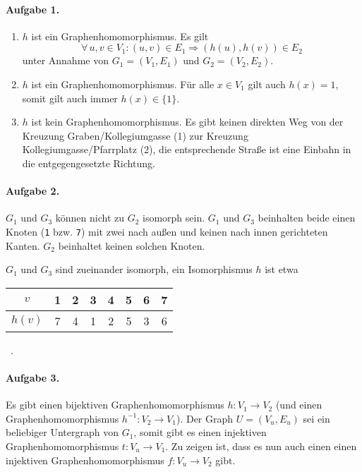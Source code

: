 \documentclass{article}
\begin{document}
\paragraph{Aufgabe 1.}

\begin{enumerate}[label=\alph*)]
    \item $h$ ist ein Graphenhomomorphismus. Es gilt
    \begin{equation*}
        \forall\, u, v \in V_1 : (u, v) \in E_1 \Rightarrow (h(u), h(v)) \in E_2
    \end{equation*}
    unter Annahme von $G_1 = (V_1, E_1)$ und $G_2 = (V_2, E_2)$.
    
    \item $h$ ist ein Graphenhomomorphismus. Für alle $x \in V_1$ gilt auch $h(x) = 1$, somit gilt auch immer $h(x) \in \{ 1 \}$.
    
    \item $h$ ist kein Graphenhomomorphismus. Es gibt keinen direkten Weg von der Kreuzung Graben/Kollegiumgasse (1) zur Kreuzung Kollegiumgasse/Pfarrplatz (2), die entsprechende Straße ist eine Einbahn in die entgegengesetzte Richtung.
\end{enumerate}

\paragraph{Aufgabe 2.}

$G_1$ und $G_3$ können nicht zu $G_2$ isomorph sein. $G_1$ und $G_3$ beinhalten beide einen Knoten (\texttt{1} bzw. \texttt{7}) mit zwei nach außen und keinen nach innen gerichteten Kanten. $G_2$ beinhaltet keinen solchen Knoten.

$G_1$ und $G_3$ sind zueinander isomorph, ein Isomorphismus $h$ ist etwa
\begin{center}
    \begin{tabular}{c | ccccccc}
        $v$    &1&2&3&4&5&6&7\\\hline
        $h(v)$ &7&4&1&2&5&3&6\\
    \end{tabular}\ .
\end{center}

\paragraph{Aufgabe 3.}

Es gibt einen bijektiven Graphenhomomorphismus $h: V_1 \rightarrow V_2$ (und einen Graphenhomomorphismus $h^{-1}: V_2 \rightarrow V_1$). Der Graph $U = (V_u, E_u)$ sei ein beliebiger Untergraph von $G_1$, somit gibt es einen injektiven Graphenhomomorphismus $t: V_u \rightarrow V_1$. Zu zeigen ist, dass es nun auch einen einen injektiven Graphenhomomorphismus $f: V_u \rightarrow V_2$ gibt.
\end{document}
